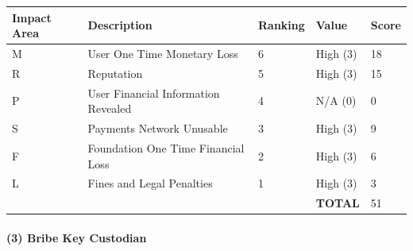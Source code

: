 \documentclass[a4paper,12pt]{article} %
\begin{document}
{\begin{center}
\begin{tabular}{ | l | l | l | l | l |}
  \hline
  \textbf{Impact Area} & \textbf{Description} & \textbf{Ranking} & \textbf{Value} & \textbf{Score}
  \\ \hline
  M & User One Time Monetary Loss			& 6	& High (3)		& 18
  \\ \hline
  R & Reputation		& 5	& High (3)		& 15
  \\ \hline
  P & User Financial Information Revealed		& 4	& N/A (0)		& 0
  \\ \hline
  S & Payments Network Unusable					& 3	& High (3)		& 9
  \\ \hline
  F & Foundation One Time Financial Loss	& 2	& High (3)		& 6
  \\ \hline
  L & Fines and Legal Penalties						& 1	& High (3)		& 3
  \\ \hline
  & & & \textbf{TOTAL} & 51
  \\ \hline
\end{tabular}
\end{center}
\label{tab:severityTamperKeyGeneration}

\paragraph{(3) Bribe Key Custodian }

}
\end{document}
